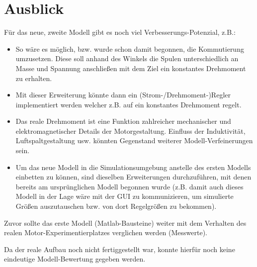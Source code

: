 \section{Ausblick}
Für das neue, zweite Modell gibt es noch viel Verbesserungs-Potenzial, z.B.:

\begin{itemize}
	\item So wäre es möglich, bzw. wurde schon damit begonnen, die Kommutierung umzusetzen. Diese soll anhand des Winkels die Spulen unterschiedlich an Masse und Spannung anschließen mit dem Ziel ein konstantes Drehmoment zu erhalten.
	
	\item Mit dieser Erweiterung könnte dann ein (Strom-/Drehmoment-)Regler implementiert werden welcher z.B. auf ein konstantes Drehmoment regelt.
	
	\item Das reale Drehmoment ist eine Funktion zahlreicher mechanischer und elektromagnetischer Details der Motorgestaltung. Einfluss der Induktivität, Luftspaltgestaltung usw. könnten Gegenstand weiterer Modell-Verfeinerungen sein. 
	
	\item Um das neue Modell in die Simulationsumgebung anstelle des ersten Modells einbetten zu können, sind dieselben Erweiterungen durchzuführen, mit denen bereits am ursprünglichen Modell begonnen wurde (z.B. damit auch dieses Modell in der Lage wäre mit der GUI zu kommunizieren, um simulierte Größen auszutauschen bzw. von dort Regelgrößen zu bekommen).
\end{itemize}

Zuvor sollte das erste Modell (Matlab-Bausteine) weiter mit dem Verhalten des realen Motor-Experimentierplatzes verglichen werden (Messwerte). 

Da der reale Aufbau noch nicht fertiggestellt war, konnte hierfür noch keine eindeutige Modell-Bewertung gegeben werden.




